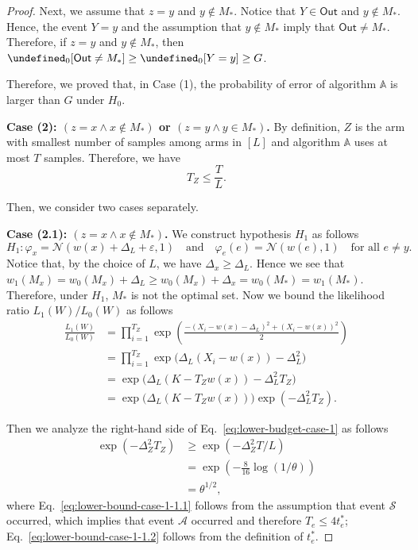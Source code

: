 \documentclass{article}
\newcommand{\Rew}{\varphi}
\newcommand{\out}{\mathsf{Out}}
\let\Pr\undefined
\DeclareMathOperator{\Pr}{Pr}
\begin{document}
\begin{spacing}{1.1}
\begin{proof}
Next, we assume that $z=y$ and $y\not \in M_*$.
Notice that $Y\in\out$ and $y\not\in M_*$.
Hence, the event $Y=y$ and the assumption that $y\not\in M_*$ imply that $\out\not=M_*$.
Therefore, if $z=y$ and $y\not\in M_*$, then
$\Pr_0[\out\not=M_*] \ge \Pr_0[Y=y] \ge  G$.

Therefore, we proved that, in Case (1), the probability of error of algorithm $\mathbb A$ is larger than $G$ under $H_0$.

\textbf{Case (2): $(z=x \wedge x\not \in M_*)$ or $(z=y \wedge y\in M_*)$.}
By definition, $Z$ is the arm with smallest number of samples among arms in $[L]$ and algorithm $\mathbb A$ uses at most $T$ samples. 
Therefore, we have
\begin{equation}
\label{eq:lower-budget-z-sample}
T_Z \le \frac{T}{L}.
\end{equation}

Then, we consider two cases separately.

\textbf{Case (2.1): $(z=x \wedge x\not \in M_*)$.}
We construct hypothesis $H_1$ as follows
$$
H_1: \Rew_x = \mathcal N(w(x)+\Delta_L+\varepsilon, 1) \quad\text{and}\quad
\Rew_e(e) = \mathcal N( w(e), 1) \quad \text{for all } e\not=y.
$$
Notice that, by the choice of $L$, we have $\Delta_x \ge \Delta_L$.
Hence we see that $w_1(M_x) = w_0(M_x)+\Delta_L \ge w_0(M_x)+\Delta_x = w_0(M_*)  = w_1(M_*)$.
Therefore, under $H_1$, $M_*$ is not the optimal set.
Now we bound the likelihood ratio $L_1(W)/L_0(W)$ as follows
\begin{align}
\frac{L_1(W)}{L_0(W)}
&= \prod_{i=1}^{T_Z} \exp\left(\frac{-(X_i-w(x)-\Delta_L)^2+(X_i-w(x))^2}{2}\right) \nonumber \\
&= \prod_{i=1}^{T_Z} \exp\big(\Delta_L(X_i-w(x))-\Delta_L^2\big) \nonumber \\
&= \exp\big(\Delta_L(K-T_Zw(x))-\Delta_L^2T_Z\big) \nonumber \\
&= \exp\big(\Delta_L(K-T_Zw(x))\big)\exp(-\Delta_L^2T_Z) \label{eq:lower-budget-case-1}.
\end{align}

Then we analyze the right-hand side of Eq.~\eqref{eq:lower-budget-case-1} as follows
\begin{align}
  \exp(-\Delta_Z^2T_Z) &\ge \exp(-\Delta_Z^2T/L) \label{eq:lower-bound-case-1-1.1} \\
					   &=\exp\left(-\frac{8}{16}\log(1/\theta)\right) \label{eq:lower-bound-case-1-1.2}\\
					   &= \theta^{1/2}\label{eq:lower-bound-case-1-1.3},
\end{align}
where Eq.~\eqref{eq:lower-bound-case-1-1.1} follows from the assumption that event $\mathcal S$ occurred, which implies that event $\mathcal A$ occurred and therefore $T_e \le 4t_e^*$; Eq.~\eqref{eq:lower-bound-case-1-1.2} follows from the definition of $t_e^*$.


\end{proof}
\end{spacing}
\end{document}
